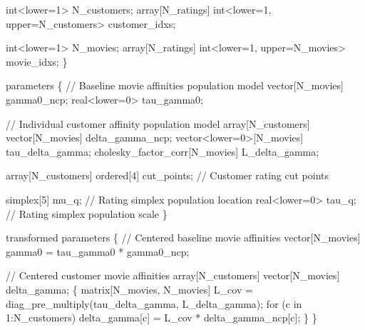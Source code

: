 \documentclass[
  letterpaper,
  DIV=11,
  numbers=noendperiod]{scrartcl}
\newenvironment{Shaded}{\begin{snugshade}}{\end{snugshade}}
\newcommand{\CommentTok}[1]{\textcolor[rgb]{0.37,0.37,0.37}{#1}}
\newcommand{\ControlFlowTok}[1]{\textcolor[rgb]{0.00,0.23,0.31}{#1}}
\newcommand{\DataTypeTok}[1]{\textcolor[rgb]{0.68,0.00,0.00}{#1}}
\newcommand{\DecValTok}[1]{\textcolor[rgb]{0.68,0.00,0.00}{#1}}
\newcommand{\KeywordTok}[1]{\textcolor[rgb]{0.00,0.23,0.31}{#1}}
\newcommand{\NormalTok}[1]{\textcolor[rgb]{0.00,0.23,0.31}{#1}}
\begin{document}
\begin{codelisting}
\begin{Shaded}
\begin{Highlighting}[]
  \DataTypeTok{int}\NormalTok{\textless{}}\KeywordTok{lower}\NormalTok{=}\DecValTok{1}\NormalTok{\textgreater{} N\_customers;}
  \DataTypeTok{array}\NormalTok{[N\_ratings] }\DataTypeTok{int}\NormalTok{\textless{}}\KeywordTok{lower}\NormalTok{=}\DecValTok{1}\NormalTok{, }\KeywordTok{upper}\NormalTok{=N\_customers\textgreater{} customer\_idxs;}

  \DataTypeTok{int}\NormalTok{\textless{}}\KeywordTok{lower}\NormalTok{=}\DecValTok{1}\NormalTok{\textgreater{} N\_movies;}
  \DataTypeTok{array}\NormalTok{[N\_ratings] }\DataTypeTok{int}\NormalTok{\textless{}}\KeywordTok{lower}\NormalTok{=}\DecValTok{1}\NormalTok{, }\KeywordTok{upper}\NormalTok{=N\_movies\textgreater{} movie\_idxs;}
\NormalTok{\}}

\KeywordTok{parameters}\NormalTok{ \{}
  \CommentTok{// Baseline movie affinities population model}
  \DataTypeTok{vector}\NormalTok{[N\_movies] gamma0\_ncp;}
  \DataTypeTok{real}\NormalTok{\textless{}}\KeywordTok{lower}\NormalTok{=}\DecValTok{0}\NormalTok{\textgreater{} tau\_gamma0;}

  \CommentTok{// Individual customer affinity population model}
  \DataTypeTok{array}\NormalTok{[N\_customers] }\DataTypeTok{vector}\NormalTok{[N\_movies] delta\_gamma\_ncp;}
  \DataTypeTok{vector}\NormalTok{\textless{}}\KeywordTok{lower}\NormalTok{=}\DecValTok{0}\NormalTok{\textgreater{}[N\_movies] tau\_delta\_gamma;}
  \DataTypeTok{cholesky\_factor\_corr}\NormalTok{[N\_movies] L\_delta\_gamma;}

  \DataTypeTok{array}\NormalTok{[N\_customers] }\DataTypeTok{ordered}\NormalTok{[}\DecValTok{4}\NormalTok{] cut\_points; }\CommentTok{// Customer rating cut points}

  \DataTypeTok{simplex}\NormalTok{[}\DecValTok{5}\NormalTok{] mu\_q;     }\CommentTok{// Rating simplex population location}
  \DataTypeTok{real}\NormalTok{\textless{}}\KeywordTok{lower}\NormalTok{=}\DecValTok{0}\NormalTok{\textgreater{} tau\_q; }\CommentTok{// Rating simplex population scale}
\NormalTok{\}}

\KeywordTok{transformed parameters}\NormalTok{ \{}
  \CommentTok{// Centered baseline movie affinities}
  \DataTypeTok{vector}\NormalTok{[N\_movies] gamma0 = tau\_gamma0 * gamma0\_ncp;}

  \CommentTok{// Centered customer movie affinities}
  \DataTypeTok{array}\NormalTok{[N\_customers] }\DataTypeTok{vector}\NormalTok{[N\_movies] delta\_gamma;}
\NormalTok{  \{}
    \DataTypeTok{matrix}\NormalTok{[N\_movies, N\_movies] L\_cov}
\NormalTok{      = diag\_pre\_multiply(tau\_delta\_gamma, L\_delta\_gamma);}
    \ControlFlowTok{for}\NormalTok{ (c }\ControlFlowTok{in} \DecValTok{1}\NormalTok{:N\_customers)}
\NormalTok{      delta\_gamma[c] = L\_cov * delta\_gamma\_ncp[c];}
\NormalTok{  \}}
\NormalTok{\}}


\end{Highlighting}
\end{Shaded}
\end{codelisting}
\end{document}
